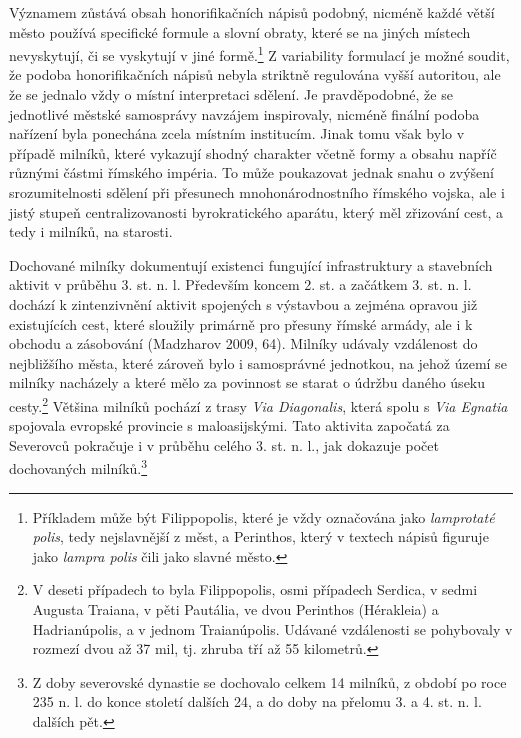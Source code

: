 Významem zůstává obsah honorifikačních nápisů podobný, nicméně každé větší město používá specifické formule a slovní obraty, které se na jiných místech nevyskytují, či se vyskytují v jiné formě.\footnote{Příkladem může být Filippopolis, které je vždy označována jako {\em lamprotaté polis}, tedy nejslavnější z měst, a Perinthos, který v textech nápisů figuruje jako {\em lampra polis} čili jako slavné město.} Z variability formulací je možné soudit, že podoba honorifikačních nápisů nebyla striktně regulována vyšší autoritou, ale že se jednalo vždy o místní interpretaci sdělení. Je pravděpodobné, že se jednotlivé městské samosprávy navzájem inspirovaly, nicméně finální podoba nařízení byla ponechána zcela místním institucím. Jinak tomu však bylo v případě milníků, které vykazují shodný charakter včetně formy a obsahu napříč různými částmi římského impéria. To může poukazovat jednak snahu o zvýšení srozumitelnosti sdělení při přesunech mnohonárodnostního římského vojska, ale i jistý stupeň centralizovanosti byrokratického aparátu, který měl zřizování cest, a tedy i milníků, na starosti.

Dochované milníky dokumentují existenci fungující infrastruktury a stavebních aktivit v průběhu 3. st. n. l. Především koncem 2. st. a začátkem 3. st. n. l. dochází k zintenzivnění aktivit spojených s výstavbou a zejména opravou již existujících cest, které sloužily primárně pro přesuny římské armády, ale i k obchodu a zásobování (Madzharov 2009, 64). Milníky udávaly vzdálenost do nejbližšího města, které zároveň bylo i samosprávné jednotkou, na jehož území se milníky nacházely a které mělo za povinnost se starat o údržbu daného úseku cesty.\footnote{V deseti případech to byla Filippopolis, osmi případech Serdica, v sedmi Augusta Traiana, v pěti Pautália, ve dvou Perinthos (Hérakleia) a Hadrianúpolis, a v jednom Traianúpolis. Udávané vzdálenosti se pohybovaly v rozmezí dvou až 37 mil, tj. zhruba tří až 55 kilometrů.} Většina milníků pochází z trasy {\em Via Diagonalis}, která spolu s {\em Via Egnatia} spojovala evropské provincie s maloasijskými. Tato aktivita započatá za Severovců pokračuje i v průběhu celého 3. st. n. l., jak dokazuje počet dochovaných milníků.\footnote{Z doby severovské dynastie se dochovalo celkem 14 milníků, z období po roce 235 n. l. do konce století dalších 24, a do doby na přelomu 3. a 4. st. n. l. dalších pět.}

